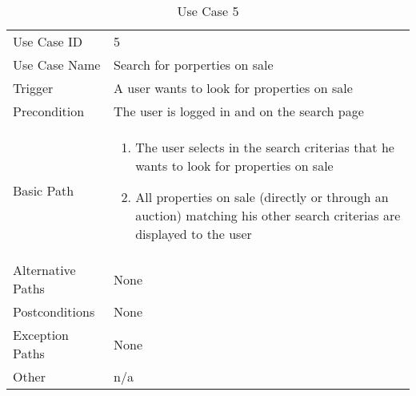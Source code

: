 \begin{table}[H]
\centering
\label{table-use-case-5}
\begin{tabular}{|p{3cm}|p{10cm}}
Use Case ID       & 5                                                         \\
Use Case Name     & Search for porperties on sale                                                         \\
Trigger           & A user wants to look for properties on sale                                         \\
Precondition      & The user is logged in and on the search page                             \\
Basic Path        & \begin{enumerate}
\item The user selects in the search criterias that he wants to look for
properties on sale
\item All properties on sale (directly or through an auction) matching his other
search criterias are displayed to the user
\end{enumerate} 
     \\
Alternative Paths & None                          \\
Postconditions    & None                                                      \\
Exception Paths   & None				\\
Other             & n/a                                                                                                                                                                                                        
\end{tabular}
\caption{Use Case 5}
\end{table}

